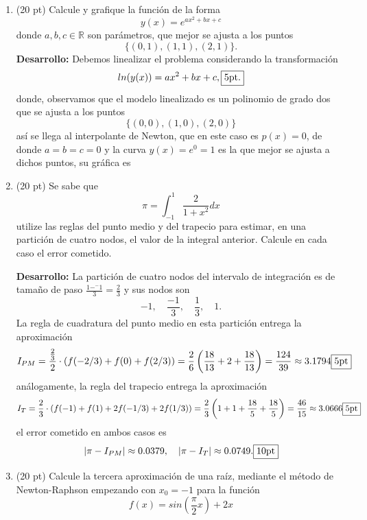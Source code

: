 \documentclass[11pt]{article}
\begin{document}
\begin{enumerate}
\newpage 
\item  (20 pt)
Calcule y grafique la funci\'on de la forma
$$
y(x)=e^{ax^2+bx+c}
$$
donde $a,b,c\in\mathbb{R}$ son par\'ametros, que mejor se ajusta a los puntos
$$
\{(0,1),(1,1),(2,1)\}.
$$
\textbf{Desarrollo:} Debemos linealizar el problema considerando la transformaci\'on
$$
ln(y(x))=ax^2+bx+c, \fbox{5pt.}
$$
donde, observamos que el modelo linealizado es un polinomio de grado dos que se ajusta a los puntos $$
\{(0,0),(1,0),(2,0)\}
$$
as\'i se llega al interpolante de Newton, que en este caso es $p(x)=0$, de donde $a=b=c=0$ y la curva $y(x)=e^0=1$  es la que mejor se ajusta a dichos puntos, su gr\'afica es 
    \begin{center}
        \end{center}


\newpage
\item  (20 pt) Se sabe que 
$$
\pi=\int_{-1}^1\frac{2}{1+x^2}dx
$$
utilize las reglas del punto medio y del trapecio para estimar, en una partici\'on de cuatro nodos, el valor de la integral anterior. Calcule en cada caso el error cometido.

\textbf{Desarrollo:} La partici\'on de cuatro nodos del intervalo de integraci\'on es de tamaño de paso $\frac{1-^-1}{3}=\frac{2}{3}$ y sus nodos son
$$
-1,\quad \frac{-1}{3},\quad \frac{1}{3}, \quad 1.
$$
La regla de cuadratura del punto medio en esta partici\'on entrega la aproximaci\'on
$$
I_{PM}=\frac{\frac{2}{3}}{2}\cdot \left( f(-2/3)+f(0)+f(2/3) \right)=\frac{2}{6}\left(\frac{18}{13}+2+\frac{18}{13}\right)=\frac{124}{39}\approx 3.1794 \fbox{5pt}
$$
análogamente, la regla del trapecio entrega la aproximaci\'on
$$
I_{T}=\frac{2}{3}\cdot \left(f(-1)+f(1)+2f(-1/3)+2f(1/3)\right)=\frac{2}{3}\left(1+1+\frac{18}{5}+\frac{18}{5}\right)=\frac{46}{15}\approx 3.0666 \fbox{5pt}
$$
el error cometido en ambos casos es
$$
|\pi-I_{PM}|\approx 0.0379, \quad |\pi-I_{T}|\approx0.0749. \fbox{10pt}
$$
\newpage
\item  (20 pt) Calcule la tercera aproximaci\'on de una ra\'iz, mediante el m\'etodo de Newton-Raphson empezando con $x_0=-1$ para la funci\'on
$$f(x)=sin\left(\frac{\pi}{2}x \right)+2x$$


\end{enumerate}
\end{document}

